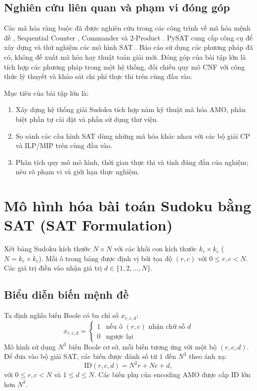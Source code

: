 \documentclass[a4paper,fleqn,nologo]{cas-sc}
\begin{document}
\subsection*{Nghiên cứu liên quan và phạm vi đóng góp}
Các mã hóa ràng buộc đã được nghiên cứu trong các công trình về mã hóa mệnh đề \cite{frisch2005effective}, Sequential Counter \cite{sinz2005towards}, Commander \cite{klieber2007efficient} và 2-Product \cite{chen2010new}. PySAT cung cấp công cụ để xây dựng và thử nghiệm các mô hình SAT \cite{ignatiev2018pysat}. Báo cáo sử dụng các phương pháp đã có, không đề xuất mã hóa hay thuật toán giải mới. Đóng góp của bài tập lớn là tích hợp các phương pháp trong một hệ thống, đối chiếu quy mô CNF với công thức lý thuyết và khảo sát chi phí thực thi trên cùng đầu vào.

Mục tiêu của bài tập lớn là:
\begin{enumerate}
    \item Xây dựng hệ thống giải Sudoku tích hợp năm kỹ thuật mã hóa AMO, phân biệt phần tự cài đặt và phần sử dụng thư viện.
    \item So sánh các cấu hình SAT dùng những mã hóa khác nhau với các bộ giải CP và ILP/MIP trên cùng đầu vào.
    \item Phân tích quy mô mô hình, thời gian thực thi và tính đúng đắn của nghiệm; nêu rõ phạm vi và giới hạn thực nghiệm.
\end{enumerate}

\section{Mô hình hóa bài toán Sudoku bằng SAT (SAT Formulation)}

Xét bảng Sudoku kích thước $N \times N$ với các khối con kích thước $k_r \times k_c$ ($N = k_r \times k_c$). Mỗi ô trong bảng được định vị bởi tọa độ $(r, c)$ với $0 \le r, c < N$. Các giá trị điền vào nhận giá trị $d \in \{1, 2, \dots, N\}$.

\subsection{Biểu diễn biến mệnh đề}
Ta định nghĩa biến Boole có ba chỉ số $x_{r,c,d}$:
\begin{equation}
x_{r,c,d} = \begin{cases}
1 & \text{nếu ô } (r, c) \text{ nhận chữ số } d \\
0 & \text{ngược lại}
\end{cases}
\end{equation}
Mô hình sử dụng $N^3$ biến Boole cơ sở, mỗi biến tương ứng
với một bộ $(r,c,d)$. Để đưa vào bộ giải SAT, các biến được
đánh số từ $1$ đến $N^3$ theo ánh xạ:
\begin{equation}
    \text{ID}(r,c,d)=N^2r+Nc+d,
\end{equation}
với $0\le r,c<N$ và $1\le d\le N$.
Các biến phụ của encoding AMO được cấp ID lớn hơn $N^3$.
\end{document}
